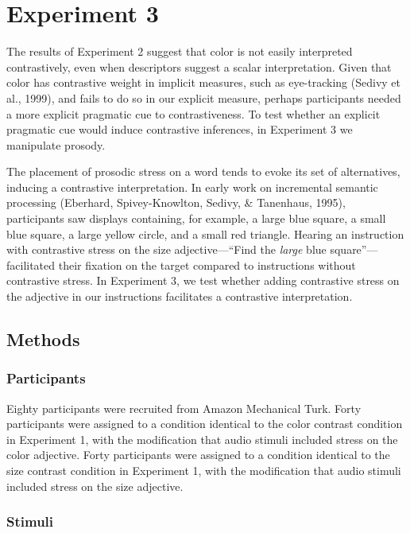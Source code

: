 \documentclass[10pt, letterpaper]{article}
\begin{document}
\hypertarget{experiment-3}{%
\section{Experiment 3}\label{experiment-3}}

The results of Experiment 2 suggest that color is not easily interpreted
contrastively, even when descriptors suggest a scalar interpretation.
Given that color has contrastive weight in implicit measures, such as
eye-tracking (Sedivy et al., 1999), and fails to do so in our explicit
measure, perhaps participants needed a more explicit pragmatic cue to
contrastiveness. To test whether an explicit pragmatic cue would induce
contrastive inferences, in Experiment 3 we manipulate prosody.

The placement of prosodic stress on a word tends to evoke its set of
alternatives, inducing a contrastive interpretation. In early work on
incremental semantic processing (Eberhard, Spivey-Knowlton, Sedivy, \&
Tanenhaus, 1995), participants saw displays containing, for example, a
large blue square, a small blue square, a large yellow circle, and a
small red triangle. Hearing an instruction with contrastive stress on
the size adjective---``Find the \emph{large} blue square''---facilitated
their fixation on the target compared to instructions without
contrastive stress. In Experiment 3, we test whether adding contrastive
stress on the adjective in our instructions facilitates a contrastive
interpretation.

\hypertarget{methods-1}{%
\subsection{Methods}\label{methods-1}}

\hypertarget{participants-1}{%
\subsubsection{Participants}\label{participants-1}}

Eighty participants were recruited from Amazon Mechanical Turk. Forty
participants were assigned to a condition identical to the color
contrast condition in Experiment 1, with the modification that audio
stimuli included stress on the color adjective. Forty participants were
assigned to a condition identical to the size contrast condition in
Experiment 1, with the modification that audio stimuli included stress
on the size adjective.

\hypertarget{stimuli-1}{%
\subsubsection{Stimuli}\label{stimuli-1}}
\end{document}
